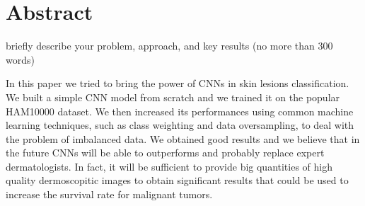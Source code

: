 \chapter*{Abstract}
briefly describe your problem, approach, and key results (no more than 300 words) 

In this paper we tried to bring the power of CNNs in skin lesions classification. We built a simple CNN model from scratch and we trained it on the popular HAM10000 dataset. We then increased its performances using common machine learning techniques, such as class weighting and data oversampling, to deal with the problem of imbalanced data. We obtained good results and we believe that in the future CNNs will be able to outperforms and probably replace expert dermatologists. In fact, it will be sufficient to provide big quantities of high quality dermoscopitic images to obtain significant results that could be used to increase the survival rate for malignant tumors.

